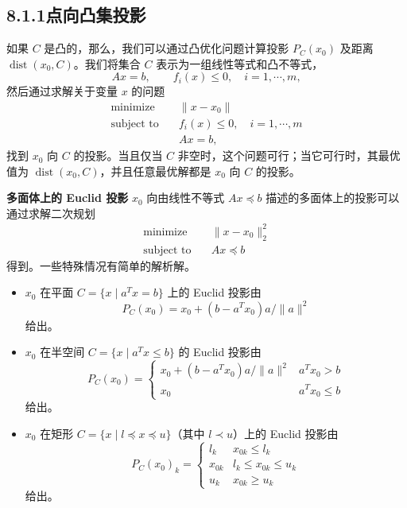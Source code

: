 \documentclass[UTF8, 12pt, fontset=fandol, oneside]{ctexart}
\begin{document}
\subsection*{8.1.1\quad 点向凸集投影}

如果 $C$ 是凸的，那么，我们可以通过凸优化问题计算投影 $P_C(x_0)$ 及距离 $\operatorname{dist}(x_0,C)$。我们将集合 $C$ 表示为一组线性等式和凸不等式，
\begin{equation}
Ax=b,\qquad f_i(x)\leq 0,\quad i=1,\cdots,m,
\tag{8.1}
\end{equation}
然后通过求解关于变量 $x$ 的问题
\begin{equation}
\begin{aligned}
\text{minimize}\quad & \|x-x_0\|\\
\text{subject to}\quad & f_i(x)\leq 0,\quad i=1,\cdots,m\\
& Ax=b,
\end{aligned}
\tag{8.2}
\end{equation}
找到 $x_0$ 向 $C$ 的投影。当且仅当 $C$ 非空时，这个问题可行；当它可行时，其最优值为 $\operatorname{dist}(x_0,C)$，并且任意最优解都是 $x_0$ 向 $C$ 的投影。

\noindent\textbf{多面体上的 Euclid 投影}\quad
$x_0$ 向由线性不等式 $Ax\preceq b$ 描述的多面体上的投影可以通过求解二次规划
\[
\begin{aligned}
\text{minimize}\quad & \|x-x_0\|_2^2\\
\text{subject to}\quad & Ax\preceq b
\end{aligned}
\]
得到。一些特殊情况有简单的解析解。

\begin{itemize}
\item $x_0$ 在平面 $C=\{x\mid a^T x=b\}$ 上的 Euclid 投影由
\[
P_C(x_0)=x_0+(b-a^Tx_0)a/\|a\|^2
\]
给出。

\item $x_0$ 在半空间 $C=\{x\mid a^T x\leq b\}$ 的 Euclid 投影由
\[
P_C(x_0)=
\begin{cases}
x_0+(b-a^Tx_0)a/\|a\|^2 & a^Tx_0>b\\
x_0 & a^Tx_0\leq b
\end{cases}
\]
给出。

\item $x_0$ 在矩形 $C=\{x\mid l\preceq x\preceq u\}$（其中 $l\prec u$）上的 Euclid 投影由
\[
P_C(x_0)_k=
\begin{cases}
l_k & x_{0k}\leq l_k\\
x_{0k} & l_k\leq x_{0k}\leq u_k\\
u_k & x_{0k}\geq u_k
\end{cases}
\]
给出。
\end{itemize}
\end{document}
